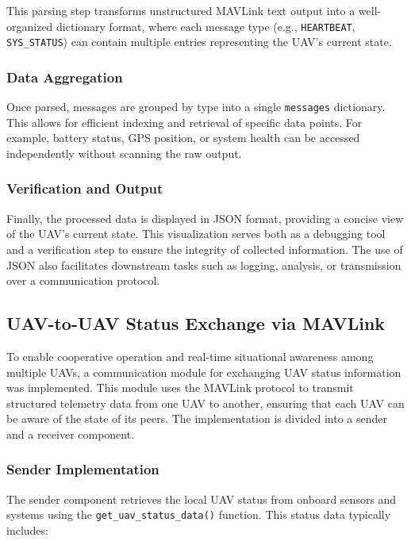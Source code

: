 This parsing step transforms unstructured MAVLink text output into a well-organized dictionary format, where each message type (e.g., \texttt{HEARTBEAT}, \texttt{SYS\_STATUS}) can contain multiple entries representing the UAV’s current state.

\subsubsection{Data Aggregation}

Once parsed, messages are grouped by type into a single \texttt{messages} dictionary. This allows for efficient indexing and retrieval of specific data points. For example, battery status, GPS position, or system health can be accessed independently without scanning the raw output.

\subsubsection{Verification and Output}

Finally, the processed data is displayed in JSON format, providing a concise view of the UAV’s current state. This visualization serves both as a debugging tool and a verification step to ensure the integrity of collected information. The use of JSON also facilitates downstream tasks such as logging, analysis, or transmission over a communication protocol.




\subsection{UAV-to-UAV Status Exchange via MAVLink}

To enable cooperative operation and real-time situational awareness among multiple UAVs, a communication module for exchanging UAV status information was implemented. This module uses the MAVLink protocol to transmit structured telemetry data from one UAV to another, ensuring that each UAV can be aware of the state of its peers. The implementation is divided into a sender and a receiver component.

\subsubsection{Sender Implementation}

The sender component retrieves the local UAV status from onboard sensors and systems using the \texttt{get\_uav\_status\_data()} function. This status data typically includes:

